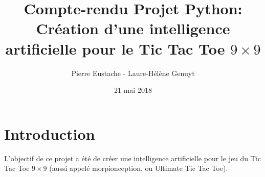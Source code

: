 \documentclass[10pt]{article}
\title{Compte-rendu Projet Python: \\ Création d'une intelligence artificielle pour le Tic Tac Toe $9\times9$ }
\author{Pierre Eustache - Laure-Hélène Genuyt }
\date{21 mai 2018}
\begin{document}
\maketitle




\section{Introduction}
L'objectif de ce projet a été de créer une intelligence artificielle pour le jeu du Tic Tac Toe $9\times9$ (aussi appelé morpionception, ou Ultimate Tic Tac Toe). 
\paragraph{}
\end{document}
